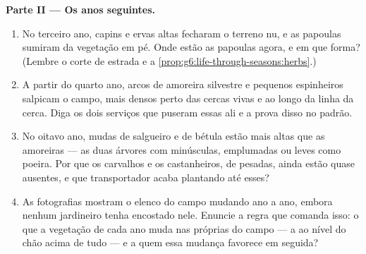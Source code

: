 \begin{problem}
\medskip\noindent\textbf{Parte II --- Os anos seguintes.}
\begin{enumerate}[resume]
  \item No terceiro ano, capins e ervas altas fecharam o terreno nu,
        e as papoulas sumiram da vegetação em pé. Onde estão as
        papoulas agora, e em que forma? (Lembre o corte de estrada e
        a \cref{prop:g6:life-through-seasons:herbs}.)
  \item A partir do quarto ano, arcos de amoreira silvestre e
        pequenos espinheiros salpicam o campo, mais densos perto das
        cercas vivas e ao longo da linha da cerca. Diga os dois
        serviços que puseram essas  ali e a prova disso no
        padrão.
  \item No oitavo ano, mudas de salgueiro e de bétula estão mais
        altas que as amoreiras --- as duas árvores com 
        minúsculas, emplumadas ou leves como poeira. Por que os
        carvalhos e os castanheiros, de  pesadas, ainda
        estão quase ausentes, e que transportador  acaba
        plantando até esses?
  \item As fotografias mostram o elenco do campo mudando ano a ano,
        embora nenhum jardineiro tenha encostado nele. Enuncie a
        regra que comanda isso: o que a vegetação de cada ano muda
        nas próprias  do campo --- a  ao nível do chão
        acima de tudo --- e a quem essa mudança favorece em seguida?
\end{enumerate}


\end{problem}
